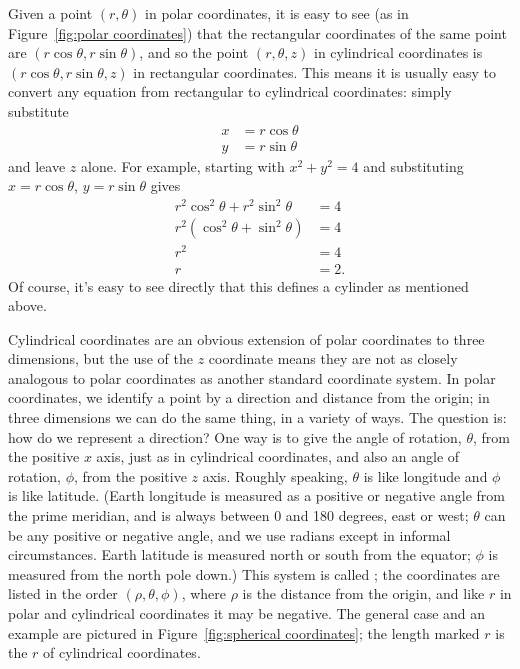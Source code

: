 Given a point $(r,\theta)$ in polar coordinates, it is easy 
to see  (as in Figure~\ref{fig:polar coordinates}) that
the rectangular coordinates of the same point are
$(r\cos\theta,r\sin\theta)$, and so the point $(r,\theta,z)$ in
cylindrical coordinates is $(r\cos\theta,r\sin\theta,z)$ in
rectangular coordinates. This means it is usually easy to convert any
equation from rectangular to cylindrical coordinates: simply substitute
\begin{align*}
  x&=r\cos\theta	\\
  y&=r\sin\theta
\end{align*}
and leave $z$ alone.
For example,
starting with $x^2+y^2=4$ and substituting $x=r\cos\theta$,
$y=r\sin\theta$ gives 
\begin{align*}
  r^2\cos^2\theta+r^2\sin^2\theta&=4	\\
  r^2(\cos^2\theta+\sin^2\theta)&=4	\\
  r^2&=4	\\
  r&=2.
\end{align*}
Of course, it's easy to see directly that this defines a cylinder as
mentioned above.

Cylindrical coordinates are an obvious extension of polar coordinates
to three dimensions, but the use of the $z$ coordinate means they are
not as closely analogous to polar coordinates as another standard
coordinate system. In polar coordinates, we identify a point by a
direction and distance from the origin; in three dimensions we can do
the same thing, in a variety of ways. The question is: how do we
represent a direction? One way is to give the angle of rotation,
$\theta$, from the positive $x$ axis, just as in cylindrical
coordinates, and also an angle of rotation, $\phi$, from the positive
$z$ axis. Roughly speaking, $\theta$ is like longitude and $\phi$ is
like latitude. (Earth longitude is measured as a positive or negative
angle from the prime meridian, and is always between 0 and 180
degrees, east or west; $\theta$ can be any positive or negative angle,
and we use radians except in informal circumstances. 
Earth latitude is measured north or south
from the equator; $\phi$ is measured from the north pole down.) This
system is called ; 
the coordinates are listed in the order
$(\rho,\theta,\phi)$, where $\rho$ is the distance from the
origin, and like $r$ in polar and cylindrical coordinates it may be negative. 
The general case and an
example are pictured in Figure~\ref{fig:spherical coordinates}; the
length marked $r$ is the $r$ of cylindrical coordinates.

